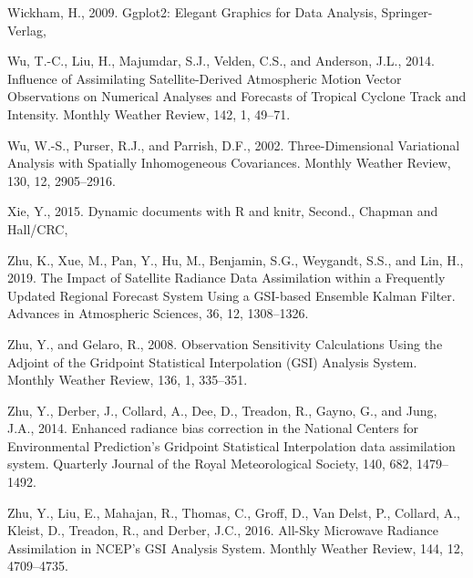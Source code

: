 \documentclass[12pt,twoside]{reedthesis}
\begin{document}
\leavevmode\hypertarget{ref-wickham2009}{}%
Wickham, H., 2009. Ggplot2: Elegant Graphics for Data Analysis, Springer-Verlag,

\leavevmode\hypertarget{ref-wu2014}{}%
Wu, T.-C., Liu, H., Majumdar, S.J., Velden, C.S., and Anderson, J.L., 2014. Influence of Assimilating Satellite-Derived Atmospheric Motion Vector Observations on Numerical Analyses and Forecasts of Tropical Cyclone Track and Intensity. Monthly Weather Review, 142, 1, 49--71.

\leavevmode\hypertarget{ref-wu2002}{}%
Wu, W.-S., Purser, R.J., and Parrish, D.F., 2002. Three-Dimensional Variational Analysis with Spatially Inhomogeneous Covariances. Monthly Weather Review, 130, 12, 2905--2916.

\leavevmode\hypertarget{ref-xie2015}{}%
Xie, Y., 2015. Dynamic documents with R and knitr, Second., Chapman and Hall/CRC,

\leavevmode\hypertarget{ref-zhu2019}{}%
Zhu, K., Xue, M., Pan, Y., Hu, M., Benjamin, S.G., Weygandt, S.S., and Lin, H., 2019. The Impact of Satellite Radiance Data Assimilation within a Frequently Updated Regional Forecast System Using a GSI-based Ensemble Kalman Filter. Advances in Atmospheric Sciences, 36, 12, 1308--1326.

\leavevmode\hypertarget{ref-zhu2008}{}%
Zhu, Y., and Gelaro, R., 2008. Observation Sensitivity Calculations Using the Adjoint of the Gridpoint Statistical Interpolation (GSI) Analysis System. Monthly Weather Review, 136, 1, 335--351.

\leavevmode\hypertarget{ref-zhu2014}{}%
Zhu, Y., Derber, J., Collard, A., Dee, D., Treadon, R., Gayno, G., and Jung, J.A., 2014. Enhanced radiance bias correction in the National Centers for Environmental Prediction's Gridpoint Statistical Interpolation data assimilation system. Quarterly Journal of the Royal Meteorological Society, 140, 682, 1479--1492.

\leavevmode\hypertarget{ref-zhu2016}{}%
Zhu, Y., Liu, E., Mahajan, R., Thomas, C., Groff, D., Van Delst, P., Collard, A., Kleist, D., Treadon, R., and Derber, J.C., 2016. All-Sky Microwave Radiance Assimilation in NCEP's GSI Analysis System. Monthly Weather Review, 144, 12, 4709--4735.


\end{document}
